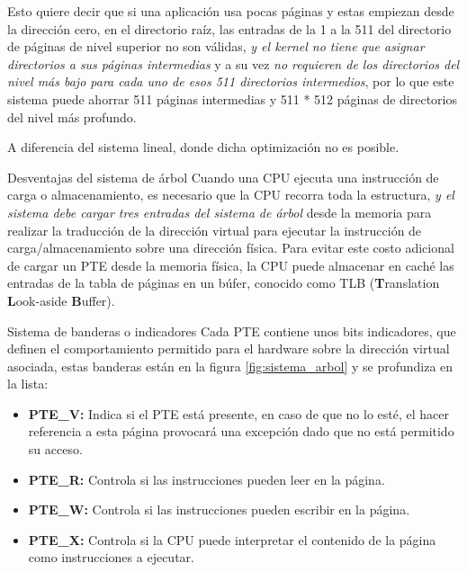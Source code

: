 \documentclass{libs/ufc_format}
\begin{document}
\begin{frame}{}
  Esto quiere decir que si una aplicación usa pocas páginas y estas empiezan desde la dirección cero, en el directorio raíz, las entradas de la 1 a la 511 del directorio de páginas de nivel superior no son válidas, \emph{y el kernel no tiene que asignar directorios a sus páginas intermedias} y a su vez \emph{no requieren de los directorios del nivel más bajo para cada uno de esos 511 directorios intermedios}, por lo que este sistema puede ahorrar 511 páginas intermedias y 511 * 512 páginas de directorios del nivel más profundo.\newline

  \vspace{0.2cm}

  A diferencia del sistema lineal, donde dicha optimización no es posible. \cite{xv6_book}
\end{frame}
\begin{frame}{Desventajas del sistema de árbol}
  Cuando una CPU ejecuta una instrucción de carga o almacenamiento, es necesario que la CPU recorra toda la estructura, \emph{y el sistema debe cargar tres entradas del sistema de árbol} desde la memoria para realizar la traducción de la dirección virtual para ejecutar la instrucción de carga/almacenamiento sobre una dirección física. Para evitar este costo adicional de cargar un PTE desde la memoria física, la CPU puede almacenar en caché las entradas de la tabla de páginas en un búfer, conocido como TLB (\textbf{T}ranslation \textbf{L}ook-aside \textbf{B}uffer). \cite{xv6_book}
\end{frame}
\begin{frame}{Sistema de banderas o indicadores}
  Cada PTE contiene unos bits indicadores, que definen el comportamiento permitido para el hardware sobre la dirección virtual asociada, estas banderas están en la figura \ref{fig:sistema_arbol} y se profundiza en la lista:

  \vspace{0.2cm}

  \begin{itemize}
    \item \textbf{PTE\_V:} Indica si el PTE está presente, en caso de que no lo esté, el hacer referencia a esta página provocará una excepción dado que no está permitido su acceso.
    \item \textbf{PTE\_R:} Controla si las instrucciones pueden leer en la página.
    \item \textbf{PTE\_W:} Controla si las instrucciones pueden escribir en la página.
    \item \textbf{PTE\_X:} Controla si la CPU puede interpretar el contenido de la página como instrucciones a ejecutar.
  \end{itemize}
\end{frame}
\end{document}
